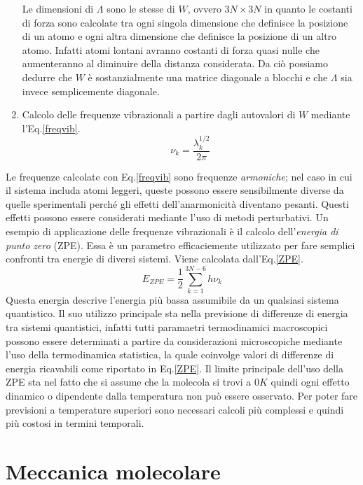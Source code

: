 \documentclass[oneside]{amsbook}
\numberwithin{section}{chapter}
\numberwithin{equation}{section}
\numberwithin{figure}{section}
\begin{document}
\begin{enumerate}
Le dimensioni di $\Lambda$ sono le stesse di $W$, ovvero $3N\times3N$ in quanto le costanti di forza sono calcolate tra ogni singola dimensione che definisce la posizione di un atomo e ogni altra dimensione che definisce la posizione di un altro atomo. Infatti atomi lontani avranno costanti di forza quasi nulle che aumenteranno al diminuire della distanza considerata. Da ciò possiamo dedurre che $W$ è sostanzialmente una matrice diagonale a blocchi e che $\Lambda$ sia invece semplicemente diagonale.
\item Calcolo delle frequenze vibrazionali a partire dagli autovalori di $W$ mediante l'Eq.\ref{freqvib}.
\begin{equation}
\label{freqvib}
\nu_k= \frac{\lambda_k^{1/2}}{2 \pi}
\end{equation}
\end{enumerate}
Le frequenze calcolate con Eq.\ref{freqvib} sono frequenze \emph{armoniche}; nel caso in cui il sistema includa atomi leggeri, queste possono essere sensibilmente diverse da quelle sperimentali perché gli effetti dell'anarmonicità diventano pesanti. Questi effetti possono essere considerati mediante l'uso di metodi perturbativi. 
Un esempio di applicazione delle frequenze vibrazionali è il calcolo dell'\emph{energia di punto zero} (ZPE). Essa è un parametro efficaciemente utilizzato per fare semplici confronti tra energie di diversi sistemi. Viene calcolata dall'Eq.\ref{ZPE}.
\begin{equation}
\label{ZPE}
E_{ZPE}=\frac{1}{2} \sum \limits_{k=1}^{3N-6}h\nu_k
\end{equation}
Questa energia descrive l'energia più bassa assumibile da un qualsiasi sistema quantistico. Il suo utilizzo principale sta nella previsione di differenze di energia tra sistemi quantistici, infatti tutti paramaetri termodinamici macroscopici possono essere determinati a partire da considerazioni microscopiche mediante l'uso della termodinamica statistica, la quale coinvolge valori di differenze di energia ricavabili come riportato in Eq.\ref{ZPE}. Il limite principale dell'uso della ZPE sta nel fatto che si assume che la molecola si trovi a $0 K$ quindi ogni effetto dinamico o dipendente dalla temperatura non può essere osservato. Per poter fare previsioni a temperature superiori sono necessari calcoli più complessi e quindi più costosi in termini temporali.


\part{Meccanica molecolare}
\end{document}
